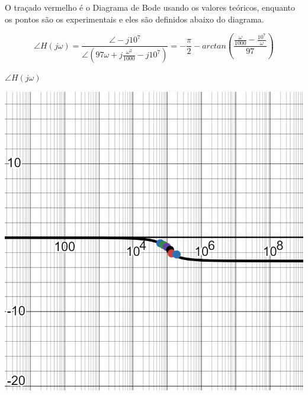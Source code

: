 \documentclass[a4 paper]{article}
\begin{document}
O traçado vermelho é o Diagrama de Bode usando os valores teóricos, enquanto os pontos são os experimentais e eles são definidos abaixo do diagrama.


\newpage
\[\angle H(j\omega) = \frac{\angle-j10^7}{\angle(97\omega+j\frac{\omega^2}{1000} -j10^7)}= -\frac{\pi}{2}-arctan\left(\frac{\frac{\omega}{1000}-\frac{10^7}{\omega}}{97}\right)\]
 
$\angle H(j\omega)$
\begin{table}[h]
\centering
\includegraphics[scale=0.45]{figuras/circ1-fase}
\end{table}\vspace{-6.75cm}\marginpar{\textbf{$\omega$}}
\vspace{6.75cm}
\end{document}
